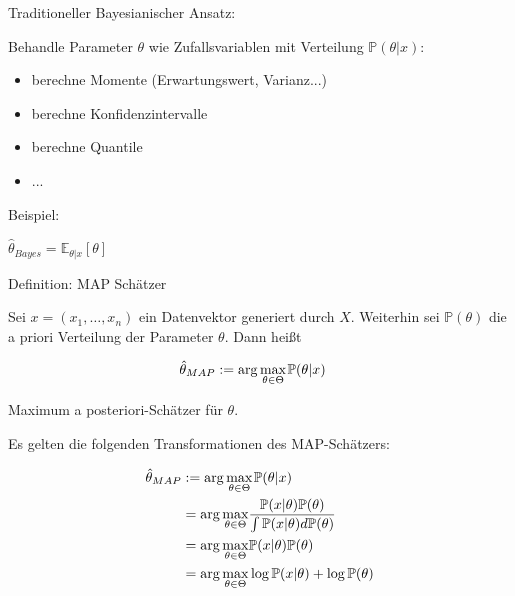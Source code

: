 \documentclass{beamer}
\begin{document}
{\begin{frame}{Traditioneller Bayesianischer Ansatz:}

Behandle Parameter $\theta$ wie Zufallsvariablen mit Verteilung $\mathbb{P}(\theta \vert x)$:\\
\begin{itemize}
	\pause \item berechne Momente (Erwartungswert, Varianz...)
	\pause \item berechne Konfidenzintervalle
	\pause \item berechne Quantile
	\pause \item ...
\end{itemize}
\pause Beispiel:
\begin{center}
$\hat{\theta}_{Bayes} = \mathbb{E}_{\theta \vert x}[\theta]$
\end{center}


\end{frame}



\begin{frame}
\begin{block}{Definition: MAP Schätzer}

Sei $x= (x_1,\dots,x_n)$ ein Datenvektor generiert durch $X$. Weiterhin sei $\mathbb{P}(\theta)$ die a priori Verteilung der Parameter $\theta$. Dann heißt

\begin{align}
\hat{\theta}_{MAP} & := \arg\underset{\theta \in \Theta}{\max}\hspace{0.3mm} \mathbb{P}(\theta \vert x)
\end{align}


Maximum a posteriori-Schätzer für $\theta$.
\end{block}
\end{frame}


\begin{frame}

Es gelten die folgenden Transformationen des MAP-Schätzers:

\begin{align}
\hat{\theta}_{MAP} & := \arg\underset{\theta \in \Theta}{\max}\hspace{0.3mm} \mathbb{P}(\theta \vert x) \\ & =  
 \arg\underset{\theta \in \Theta}{\max} \frac{ \mathbb{P}(x\vert\theta) \mathbb{P}(\theta)}{\int  \mathbb{P}(x\vert \theta) d\mathbb{P}(\theta)}\\
 & = \arg\underset{\theta \in \Theta}{\max}  \mathbb{P}(x\vert \theta) \mathbb{P}(\theta) \\
 & = \arg\underset{\theta \in \Theta}{\max} \log\mathbb{P}(x\vert \theta) + \log \mathbb{P}(\theta)
\end{align}


\end{frame}}
\end{document}
